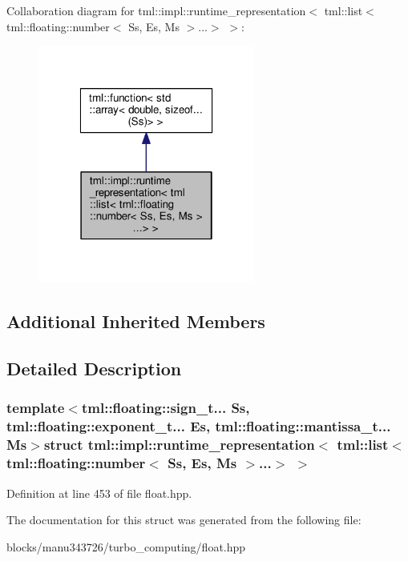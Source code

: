 Collaboration diagram for tml\+:\+:impl\+:\+:runtime\+\_\+representation$<$ tml\+:\+:list$<$ tml\+:\+:floating\+:\+:number$<$ Ss, Es, Ms $>$...$>$ $>$\+:
\nopagebreak
\begin{figure}[H]
\begin{center}
\leavevmode
\includegraphics[width=202pt]{structtml_1_1impl_1_1runtime__representation_3_01tml_1_1list_3_01tml_1_1floating_1_1number_3_01_5d384d8881b6ccef70e530deffea2742}
\end{center}
\end{figure}
\subsection*{Additional Inherited Members}


\subsection{Detailed Description}
\subsubsection*{template$<$tml\+::floating\+::sign\+\_\+t... Ss, tml\+::floating\+::exponent\+\_\+t... Es, tml\+::floating\+::mantissa\+\_\+t... Ms$>$struct tml\+::impl\+::runtime\+\_\+representation$<$ tml\+::list$<$ tml\+::floating\+::number$<$ Ss, Es, Ms $>$...$>$ $>$}



Definition at line 453 of file float.\+hpp.



The documentation for this struct was generated from the following file\+:\begin{DoxyCompactItemize}
\item 
blocks/manu343726/turbo\+\_\+computing/float.\+hpp\end{DoxyCompactItemize}
